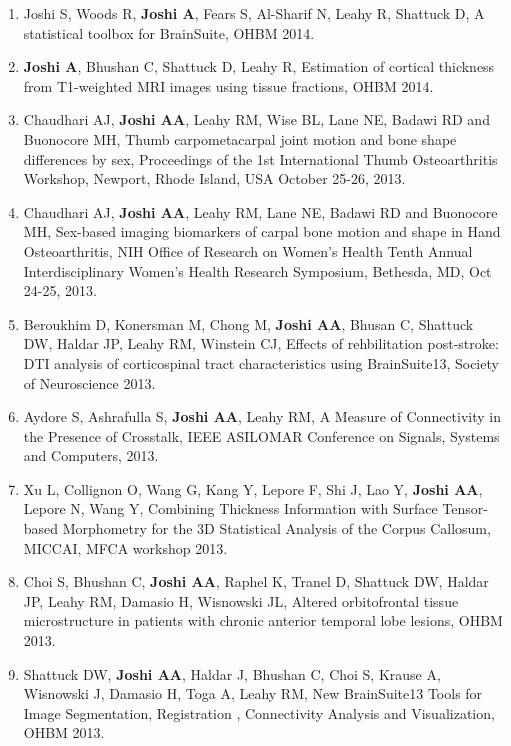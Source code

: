 \documentclass[overlapped,line,letterpaper]{res}
\begin{document}
\begin{resume}
\begin{enumerate}
    \item Joshi S, Woods R, \textbf{Joshi A}, Fears S, Al-Sharif N, Leahy R, Shattuck D, {A statistical toolbox for BrainSuite}, OHBM 2014.

    \item \textbf{Joshi A}, Bhushan C, Shattuck D, Leahy R, {Estimation of cortical thickness from T1-weighted MRI images using tissue fractions}, OHBM 2014.

    \item Chaudhari AJ, \textbf{Joshi AA}, Leahy RM, Wise BL, Lane NE, Badawi RD and Buonocore MH, {Thumb carpometacarpal joint motion and bone shape differences by sex}, Proceedings of the 1st International Thumb Osteoarthritis Workshop, Newport, Rhode Island, USA October 25-26, 2013.

    \item Chaudhari AJ, \textbf{Joshi AA}, Leahy RM, Lane NE, Badawi RD and Buonocore MH, {Sex-based imaging biomarkers of carpal bone motion and shape in Hand Osteoarthritis}, NIH Office of Research on Women's Health Tenth Annual Interdisciplinary Women's Health Research Symposium, Bethesda, MD, Oct 24-25, 2013.

    \item Beroukhim D, Konersman M, Chong M, \textbf{Joshi AA}, Bhusan C, Shattuck DW, Haldar JP, Leahy RM, Winstein CJ, {Effects of rehbilitation post-stroke: DTI analysis of corticospinal tract characteristics using BrainSuite13}, Society of Neuroscience 2013.

    \item Aydore S, Ashrafulla S, \textbf{Joshi AA}, Leahy RM, {A Measure of Connectivity in the Presence of Crosstalk}, IEEE ASILOMAR Conference on Signals, Systems and Computers, 2013.

    \item Xu L, Collignon O, Wang G, Kang Y, Lepore F, Shi J, Lao Y, \textbf{Joshi AA}, Lepore N, Wang Y, {Combining Thickness Information with Surface Tensor-based Morphometry for the 3D Statistical Analysis of the Corpus Callosum}, MICCAI, MFCA workshop 2013.

    \item Choi S, Bhushan C, \textbf{Joshi AA}, Raphel K, Tranel D, Shattuck DW, Haldar JP, Leahy RM, Damasio H, Wisnowski JL, {Altered orbitofrontal tissue microstructure in patients with chronic anterior temporal lobe lesions}, OHBM 2013.

    \item Shattuck DW, \textbf{Joshi AA}, Haldar J, Bhushan C, Choi S, Krause A, Wisnowski J, Damasio H, Toga A, Leahy RM, {New BrainSuite13 Tools for Image Segmentation, Registration , Connectivity Analysis and Visualization}, OHBM 2013.


\end{enumerate}
\end{resume}
\end{document}
